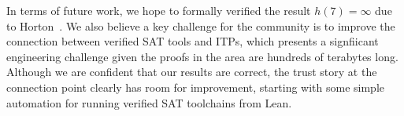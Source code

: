 In terms of future work, we hope to formally verified the result $h(7) = \infty$ due to Horton~\cite{hortonSetsNoEmpty1983}.
We also believe a key challenge for the community is to improve the connection between verified SAT tools and ITPs, which presents a signfiicant engineering challenge given the proofs in the area are hundreds of terabytes long.
Although we are confident that our results are correct,
the trust story at the connection point  clearly has room for improvement,
starting with some simple automation for running verified SAT toolchains from Lean.
